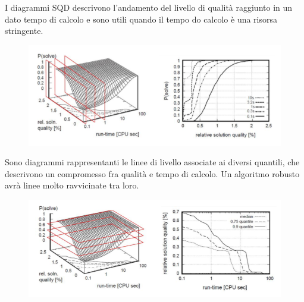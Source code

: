 \documentclass[\main/main.tex]{subfiles}
\begin{document}
\begin{definition}
    I diagrammi SQD descrivono l'andamento del livello di qualità raggiunto in un dato tempo di calcolo e sono utili quando il tempo do calcolo è una risorsa stringente.
    \begin{figure}
        \centering
        \includegraphics[width=\textwidth]{images/SQD.png}
    \end{figure}
\end{definition}
\begin{definition}
    Sono diagrammi rappresentanti le linee di livello associate ai diversi quantili, che descrivono un compromesso fra qualità e tempo di calcolo. Un algoritmo robusto avrà linee molto ravvicinate tra loro.
    \begin{figure}
        \centering
        \includegraphics[width=\textwidth]{images/SQT.png}
    \end{figure}
\end{definition}
\end{document}
